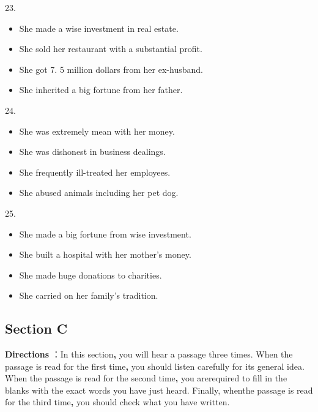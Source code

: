 \documentclass[UTF8,11pt]{ctexart}
\begin{document}
23.


\begin{itemize}[leftmargin=2em,itemsep=.2em,topsep=.4em]\item[A.] She made a wise investment in real estate.
\item[B.] She sold her restaurant with a substantial profit.
\item[C.] She got 7. 5 million dollars from her ex-husband.
\item[D.] She inherited a big fortune from her father.
\end{itemize}

24.


\begin{itemize}[leftmargin=2em,itemsep=.2em,topsep=.4em]\item[A.] She was extremely mean with her money.
\item[B.] She was dishonest in business dealings.
\item[C.] She frequently ill-treated her employees.
\item[D.] She abused animals including her pet dog.
\end{itemize}

25.


\begin{itemize}[leftmargin=2em,itemsep=.2em,topsep=.4em]\item[A.] She made a big fortune from wise investment.
\item[B.] She built a hospital with her mother’s money.
\item[C.] She made huge donations to charities.
\item[D.] She carried on her family’s tradition.
\end{itemize}

\subsection*{Section C}


\textbf{Directions} ：In this section\textbf{,} you will hear a passage three times. When the passage is read for the first time\textbf{,} you should listen carefully for its general idea. When the passage is read for the second time\textbf{,} you arerequired to fill in the blanks with the exact words you have just heard. Finally, whenthe passage is read for the third time\textbf{,} you should check what you have written.
\end{document}

